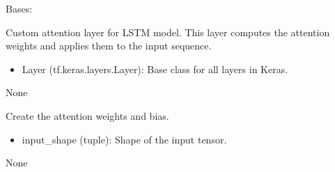 \documentclass[letterpaper,10pt,english]{sphinxmanual}
\begin{document}
\begin{fulllineitems}
\label{\detokenize{network_watcher:network_watcher.AttentionLayer}}
\pysigstartsignatures
{}
\pysigstopsignatures
\sphinxAtStartPar
Bases: 

\sphinxAtStartPar
Custom attention layer for LSTM model.
This layer computes the attention weights and applies them to the input sequence.
\begin{description}
\begin{itemize}
\item {} 
\sphinxAtStartPar
Layer (tf.keras.layers.Layer): Base class for all layers in Keras.

\end{itemize}

\sphinxAtStartPar
None

\end{description}

\begin{fulllineitems}
\label{\detokenize{network_watcher:network_watcher.AttentionLayer.build}}
\pysigstartsignatures
{}
\pysigstopsignatures
\sphinxAtStartPar
Create the attention weights and bias.
\begin{description}
\begin{itemize}
\item {} 
\sphinxAtStartPar
input\_shape (tuple): Shape of the input tensor.

\end{itemize}

\sphinxAtStartPar
None

\end{description}

\end{fulllineitems}



\end{fulllineitems}
\end{document}

